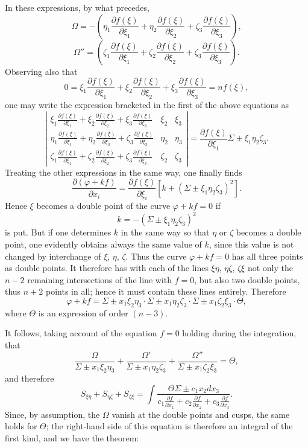 \documentclass[10pt]{article}
\begin{document}
In these expressions, by what precedes,
\[
\Omega=-\left(\eta_1\frac{\partial f(\xi)}{\partial \xi_1}+\eta_2\frac{\partial f(\xi)}{\partial \xi_2}+\zeta_3\frac{\partial f(\xi)}{\partial \xi_3}\right),
\]
\[
\Omega''=\left(\zeta_1\frac{\partial f(\xi)}{\partial \xi_1}+\zeta_2\frac{\partial f(\xi)}{\partial \xi_2}+\zeta_3\frac{\partial f(\xi)}{\partial \xi_3}\right).
\]
Observing also that
\[
0=\xi_1\frac{\partial f(\xi)}{\partial \xi_1}+\xi_2\frac{\partial f(\xi)}{\partial \xi_2}+\xi_3\frac{\partial f(\xi)}{\partial \xi_3}=nf(\xi),
\]
one may write the expression bracketed in the first of the above equations as
\[
\left|
\begin{array}{ccc}
\xi_1\frac{\partial f(\xi)}{\partial \xi_1}+\xi_2\frac{\partial f(\xi)}{\partial \xi_2}+\xi_3\frac{\partial f(\xi)}{\partial \xi_3} & \xi_2 & \xi_3\\
\eta_1\frac{\partial f(\xi)}{\partial \xi_1}+\eta_2\frac{\partial f(\xi)}{\partial \xi_2}+\zeta_3\frac{\partial f(\xi)}{\partial \xi_3} & \eta_2 & \eta_3\\
\zeta_1\frac{\partial f(\xi)}{\partial \xi_1}+\zeta_2\frac{\partial f(\xi)}{\partial \xi_2}+\zeta_3\frac{\partial f(\xi)}{\partial \xi_3} & \zeta_2 & \zeta_3
\end{array}
\right|
=\frac{\partial f(\xi)}{\partial \xi_1}\Sigma\pm \xi_1\eta_2\zeta_3.
\]
Treating the other expressions in the same way, one finally finds
\[
\frac{\partial(\varphi+kf)}{\partial x_i}=\frac{\partial f(\xi)}{\partial \xi_i}\left[k+(\Sigma\pm\xi_1\eta_2\zeta_3)^2\right].
\]
Hence $\xi$ becomes a double point of the curve $\varphi+kf=0$ if
\[
k=-(\Sigma\pm\xi_1\eta_2\zeta_3)^2
\]
is put. But if one determines $k$ in the same way so that $\eta$ or $\zeta$ becomes a double point, one evidently obtains always the same value of $k$, since this value is not changed by interchange of $\xi$, $\eta$, $\zeta$. Thus the curve $\varphi+kf=0$ has all three points as double points. It therefore has with each of the lines $\xi\eta$, $\eta\zeta$, $\zeta\xi$ not only the $n-2$ remaining intersections of the line with $f=0$, but also two double points, thus $n+2$ points in all; hence it must contain these lines entirely. Therefore
\[
\varphi+kf=\Sigma\pm x_1\xi_2\eta_3\cdot\Sigma\pm x_1\eta_2\zeta_3\cdot\Sigma\pm x_1\zeta_2\xi_3\cdot\Theta,
\]
where $\Theta$ is an expression of order $(n-3)$.

It follows, taking account of the equation $f=0$ holding during the integration, that
\[
\frac{\Omega}{\Sigma\pm x_1\xi_2\eta_3}
+\frac{\Omega'}{\Sigma\pm x_1\eta_2\zeta_3}
+\frac{\Omega''}{\Sigma\pm x_1\zeta_2\xi_3}=\Theta,
\]
and therefore
\[
S_{\xi\eta}+S_{\eta\zeta}+S_{\zeta\xi}
=\int\frac{\Theta\Sigma\pm c_1x_2dx_3}{c_1\frac{\partial f}{\partial x_1}+c_2\frac{\partial f}{\partial x_2}+c_3\frac{\partial f}{\partial x_3}}.
\]
Since, by assumption, the $\Omega$ vanish at the double points and cusps, the same holds for $\Theta$; the right-hand side of this equation is therefore an integral of the first kind, and we have the theorem:
\end{document}
